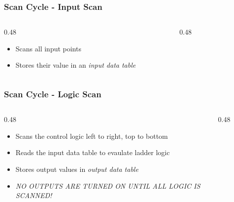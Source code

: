 \begin{frame}
    \frametitle{Scan Cycle - Input Scan}

    \begin{columns}
        \begin{column}{0.48\linewidth}
            \begin{itemize}
                \item Scans all input points
                \item Stores their value in an \emph{input data table}
            \end{itemize}
        \end{column}
        \begin{column}{0.48\linewidth}
            \begin{figure}
                \centering
                \resizebox{0.9\columnwidth}{!}{
                    
                }
            \end{figure}
        \end{column}
    \end{columns}
\end{frame}

\begin{frame}
    \frametitle{Scan Cycle - Logic Scan}

    \begin{columns}
        \begin{column}{0.48\linewidth}
            \begin{itemize}
                \item Scans the control logic left to right, top to bottom
                \item Reads the input data table to evaulate ladder logic
                \item Stores output values in \emph{output data table}
                \item \emph{NO OUTPUTS ARE TURNED ON UNTIL ALL LOGIC IS SCANNED!}
            \end{itemize}
        \end{column}
        \begin{column}{0.48\linewidth}
            \begin{figure}
                \centering
                \resizebox{0.9\columnwidth}{!}{
                    
                }
            \end{figure}
        \end{column}
    \end{columns}
\end{frame}

